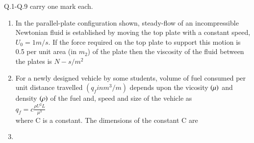 \documentclass[journal]{IEEEtran}
\begin{document}
Q.1-Q.9 carry one mark each.
\begin{enumerate}[start=1]
\item %
In the parallel-plate configuration shown, steady-flow of an incompressible Newtonian fluid is established by moving the top plate with a constant speed, $U_0=1m/s$. If the force required on the top plate to support this motion is 0.5 per unit area (in $m_2$) of the plate then the viscosity of the fluid between the plates is \underline{\hspace{2cm}} $N-s/m^2$ 
\begin{figure}[!ht]
\centering
{}%
\label{fig:my_label}
\end{figure}
\item %
For a newly designed vehicle by some students, volume of fuel consumed per unit distance travelled $(q_f in m^3/m)$ depends upon the vicosity $\left(\mu\right)$ and density $\left(\rho\right)$ of the fuel and, speed  and size  of the vehicle as \\
$q_f = c\frac{\rho U^2 L}{\mu ^3}$ \\
where C is a constant. The dimensions of the constant C are
\begin{enumerate}
\end{enumerate}
\item %

\end{enumerate}
\end{document}
